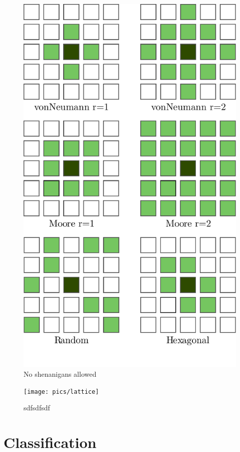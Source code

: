 \documentclass[
]{book}
\begin{document}
\begin{figure}

{\centering \includegraphics[width=0.8\linewidth]{pics/neighborhoods} 

}

\caption{No shenanigans allowed}\label{fig:CA-neighborhoods}
\end{figure}

\begin{figure}

{\centering \texttt{[image: pics/lattice]} 

}

\caption{sdfsdfsdf}\label{fig:CA-lattice}
\end{figure}

\hypertarget{classification}{%
\section{Classification}\label{classification}}
\end{document}
